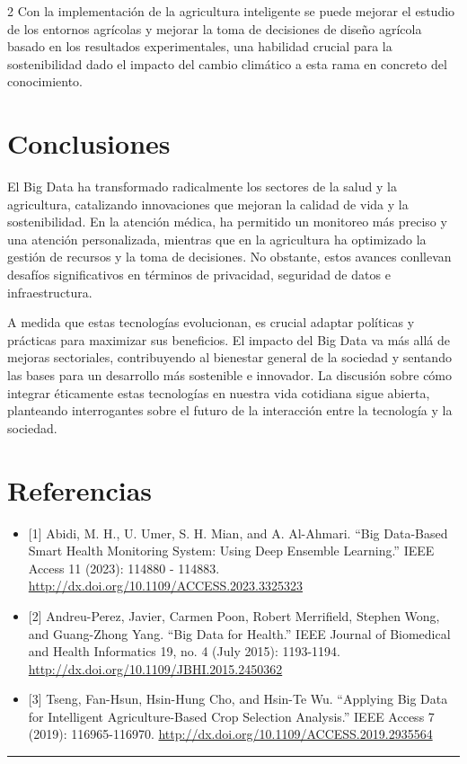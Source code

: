 \documentclass[12pt,spanish,Letterpaper,openany]{book}
\newcommand{\HRule}{\begin{center}\rule{0.5\linewidth}{0.2mm}\end{center}}
\begin{document}
\begin {multicols}{2}
Con la implementación de la agricultura inteligente se puede mejorar el estudio de los entornos agrícolas y mejorar la toma de decisiones de diseño agrícola basado en los resultados experimentales, una habilidad crucial para la sostenibilidad dado el impacto del cambio climático a esta rama en concreto del conocimiento.

\hypertarget{conclusiones-13}{%
\section{Conclusiones}\label{conclusiones-13}}

El Big Data ha transformado radicalmente los sectores de la salud y la agricultura, catalizando innovaciones que mejoran la calidad de vida y la sostenibilidad. En la atención médica, ha permitido un monitoreo más preciso y una atención personalizada, mientras que en la agricultura ha optimizado la gestión de recursos y la toma de decisiones. No obstante, estos avances conllevan desafíos significativos en términos de privacidad, seguridad de datos e infraestructura.

A medida que estas tecnologías evolucionan, es crucial adaptar políticas y prácticas para maximizar sus beneficios. El impacto del Big Data va más allá de mejoras sectoriales, contribuyendo al bienestar general de la sociedad y sentando las bases para un desarrollo más sostenible e innovador. La discusión sobre cómo integrar éticamente estas tecnologías en nuestra vida cotidiana sigue abierta, planteando interrogantes sobre el futuro de la interacción entre la tecnología y la sociedad.

\hypertarget{referencias-12}{%
\section{Referencias}\label{referencias-12}}

\begin{itemize}
\item
  {[}1{]} Abidi, M. H., U. Umer, S. H. Mian, and A. Al-Ahmari. ``Big Data-Based Smart Health Monitoring System: Using Deep Ensemble Learning.'' IEEE Access 11 (2023): 114880 - 114883. \url{http://dx.doi.org/10.1109/ACCESS.2023.3325323}
\item
  {[}2{]} Andreu-Perez, Javier, Carmen Poon, Robert Merrifield, Stephen Wong, and Guang-Zhong Yang. ``Big Data for Health.'' IEEE Journal of Biomedical and Health Informatics 19, no. 4 (July 2015): 1193-1194. \url{http://dx.doi.org/10.1109/JBHI.2015.2450362}
\item
  {[}3{]} Tseng, Fan-Hsun, Hsin-Hung Cho, and Hsin-Te Wu. ``Applying Big Data for Intelligent Agriculture-Based Crop Selection Analysis.'' IEEE Access 7 (2019): 116965-116970. \url{http://dx.doi.org/10.1109/ACCESS.2019.2935564}
\end{itemize}

\end {multicols}

\medskip

\HRule

\medskip







\end{document}
